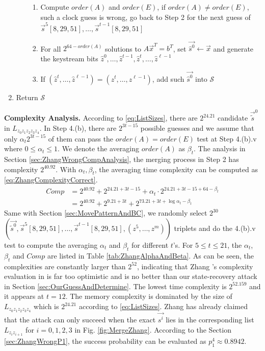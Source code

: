 \begin{enumerate}
\begin{enumerate}
\begin{enumerate}
        \item Compute $order(A)$ and $order(E)$, if $order(A)\neq order(E)$, such a clock guess is wrong, go back to Step 2 for the next guess of $\vec{s}^5[8,29,51], \ldots, \vec{s}^{t-1}[8,29,51]$
        \item For all $2^{64-order(A)}$ solutions to $A\vec x^T=b^T$, set $\vec{\hat{s}^0}\leftarrow \vec x$ and generate the keystream bits $\hat{z}^0,\ldots, \hat{z}^{t-1},\hat{z}^{t},\ldots, \hat{z}^{\ell-1}$
        \item If $(\hat{z}^{t},\ldots, \hat{z}^{\ell-1})=(z^{t},\ldots, z^{\ell-1})$, add such $\vec{\hat{s}^0}$ into $\mathcal{S}$
      \end{enumerate}
   \end{enumerate}
  \item Return $\mathcal{S}$
\end{enumerate}

\noindent\textbf{Complexity Analysis. } 
According to \eqref{eq:ListSizes}, there are $2^{24.21}$ candidate $\vec{\tilde{s}}^0$ in $L_{z_0z_1z_2z_3z_4}$. 
In Step 4.(b), there are $2^{3t-15}$ possible guesses and we assume that only $\alpha_t 2^{3t-15}$ of them can pass the $order(A)=order(E)$ test at Step 4.(b).v where $0\leq \alpha_t \leq 1$.
We denote the averaging $order(A)$ as $\beta_t$.
The analysis in Section \ref{sec:ZhangWrongCompAnalysis}, the merging process in Step 2 has complexity $2^{40.92}$.
With $\alpha_t ,\beta_t $, the averaging time complexity can be computed as \eqref{eq:ZhangComplexityCorrect}.
\begin{equation}\label{eq:ZhangOriginComplexity}
\begin{aligned}
Comp&=2^{40.92}+2^{24.21+3t-15}+\alpha_t \cdot 2^{24.21+3t-15+64-\beta_t}\\
&=2^{40.92}+2^{9.21+3t}+2^{73.21+3t+\log \alpha_t -\beta_t}
\end{aligned}
\end{equation}
Same with Section \ref{sec:MovePatternAndBC}, we randomly select $2^{30}$ $\left(\vec{\tilde{s}^0}, \vec{s}^5[8,29,51], \ldots, \vec{s}^{t-1}[8,29,51], (z^5,\ldots, z^m)\right)$ triplets and do the 4.(b).v test to compute the averaging $\alpha_t$ and $\beta_t$ for different $t$'s.
For $5\leq t\leq 21$, the $\alpha_t$, $\beta_t$ and $Comp$ are listed in Table \ref{tab:ZhangAlphaAndBeta}. 
As can be seen, the complexities are constantly larger than $2^{52}$, indicating that Zhang \etal's complexity evaluation in \cite{AC:Zhang19} is far too optimistic and is no better than our state-recovery attack in Section \ref{sec:OurGuessAndDetermine}.
The lowest time complexity is $2^{52.159}$ and it appears at $t=12$.
The memory complexity is dominated by the size of $L_{z_0z_1z_2z_3z_4}$ which is $2^{24.21}$ according to \eqref{eq:ListSizes}.
Zhang \etal has already claimed that the attack can only succeed when the exact $\vec{s^i}$ lies in the corresponding list $L_{z_iz_{i+1}}$ for $i=0,1,2,3$ in Fig. \ref{fig:MergeZhang}.
According to the Section \ref{sec:ZhangWrongP1}, the success probability can be evaluated as $p_1^4\approx 0.8942$.

